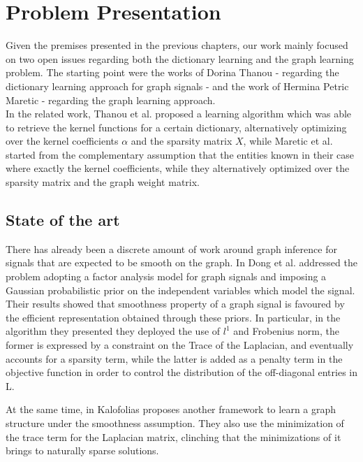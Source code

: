 \chapter{Problem Presentation}
Given the premises presented in the previous chapters, our work mainly focused on two open issues regarding both the dictionary learning and the graph learning problem. The starting point were the works of Dorina Thanou -  regarding the dictionary learning approach for graph signals - and the work of Hermina Petric Maretic - regarding the graph learning approach.\\
In the related work, Thanou et al. proposed a learning algorithm which was able to retrieve the kernel functions for a certain dictionary, alternatively optimizing over the kernel coefficients $\alpha$ and the sparsity matrix $X$, while Maretic et al. started from the complementary assumption that the entities known in their case where exactly the kernel coefficients, while they alternatively optimized over the sparsity matrix and the graph weight matrix.

\section{State of the art}
There has already been a discrete amount of work around graph inference for signals that are expected to be smooth on the graph.  In \cite{Dong2016} Dong et al. addressed the problem adopting a factor analysis model for graph signals and imposing a Gaussian probabilistic prior on the independent variables which model the signal. Their results showed that smoothness property of a graph signal is favoured by the efficient representation obtained through these priors. In particular, in the algorithm they presented they deployed the use of $l^1$ and Frobenius norm, the former is expressed by a constraint on the Trace of the Laplacian, and eventually accounts for a sparsity term, while the latter is added as a penalty term in the objective function in order to control the distribution of the off-diagonal entries in L.

At the same time, in \cite{Kalofolias2016} Kalofolias proposes another framework to learn a graph structure under the smoothness assumption. They also use the minimization of the trace term for the Laplacian matrix, clinching that the minimizations of it brings to naturally sparse solutions.

